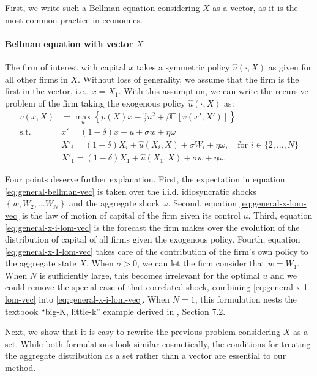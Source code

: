 \documentclass[12pt]{article}
\newcommand{\set}[1]{\ensuremath{\left\{{#1}\right\}}}
\newcommand{\expec}[2][]{\ensuremath{\mathbb{E}_{{#1}}\left[ {#2} \right]}}
\begin{document}
First, we write such a Bellman equation considering $X$ as a vector, as it is the most common practice in economics.

\paragraph{Bellman equation with vector $X$} The firm of interest with capital $x$ takes a symmetric policy $\hat{u}(\cdot,X)$ as given for all other firms in $X$. Without loss of generality, we assume that the firm is the first in the vector, i.e., $x = X_1$.  With this assumption, we can write the recursive problem of the firm taking the exogenous policy $\hat{u}(\cdot, X)$ as:
\begin{align}
v(x,X) &=\max_{u}\left\{p(X)x -  \frac{\gamma}{2} u^2 + \beta \expec{v(x',X')}\right\}\label{eq:general-bellman-vec}\\
\text{s.t. } & x' = (1-\delta)x + u + \sigma w + \eta \omega\label{eq:general-x-lom-vec}\\
& X'_i = (1-\delta)X_i + \hat{u}(X_i,X) + \sigma W_i + \eta \omega,\quad\text{for } i \in \{2,...,N\}\label{eq:general-x-i-lom-vec}\\
& X'_1 = (1-\delta)X_1 + \hat{u}(X_1,X)+\sigma w + \eta \omega. \label{eq:general-x-1-lom-vec}
\end{align}

Four points deserve further explanation. First, the expectation in equation \eqref{eq:general-bellman-vec} is taken over the i.i.d. idiosyncratic shocks $\set{w, W_2, \ldots W_N}$ and the aggregate shock $\omega$. Second, equation \eqref{eq:general-x-lom-vec} is the law of motion of capital of the firm given its control $u$. Third, equation \eqref{eq:general-x-i-lom-vec} is the forecast the firm makes over the evolution of the distribution of capital of all firms given the exogenous policy. Fourth, equation \eqref{eq:general-x-1-lom-vec} takes care of the contribution of the firm's own policy to the aggregate state $X$. When $\sigma > 0$, we can let the firm consider that $w = W_1$. When $N$ is sufficiently large, this becomes irrelevant for the optimal $u$ and we could remove the special case of that correlated shock, combining \eqref{eq:general-x-1-lom-vec} into \eqref{eq:general-x-i-lom-vec}.  When $N=1$, this formulation nests the textbook ``big-K, little-k'' example derived in \citet{LjungqvistSargent2018}, Section 7.2.
	
Next, we show that it is easy to rewrite the previous problem considering $X$ as a set. While both formulations look similar cosmetically, the conditions for treating the aggregate distribution as a set rather than a vector are essential to our method.
\end{document}
